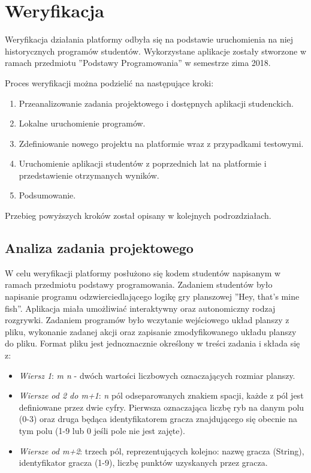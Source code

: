\chapter{Weryfikacja}
\label{chapter:verify}

Weryfikacja działania platformy odbyła się na podstawie uruchomienia na niej historycznych programów studentów.
Wykorzystane aplikacje zostały stworzone w ramach przedmiotu ”Podstawy Programowania” w semestrze zima 2018.

Proces weryfikacji można podzielić na następujące kroki:
\begin{enumerate}
    \item Przeanalizowanie zadania projektowego i dostępnych aplikacji studenckich.
    \item Lokalne uruchomienie programów.
    \item Zdefiniowanie nowego projektu na platformie wraz z przypadkami testowymi.
    \item Uruchomienie aplikacji studentów z poprzednich lat na platformie i przedstawienie otrzymanych wyników.
    \item Podsumowanie.
\end{enumerate}

Przebieg powyższych kroków został opisany w kolejnych podrozdziałach.


\section{Analiza zadania projektowego}
\label{analysis_students_projects}

W celu weryfikacji platformy posłużono się kodem studentów napisanym w ramach przedmiotu podstawy programowania.
Zadaniem studentów było napisanie programu odzwierciedlającego logikę gry planszowej ”Hey, that’s mine fish”.
Aplikacja miała umożliwiać interaktywny oraz autonomiczny rodzaj rozgrywki.
Zadaniem programów było wczytanie wejściowego układ planszy z pliku, wykonanie zadanej akcji oraz zapisanie zmodyfikowanego układu planszy do pliku.
Format pliku jest jednoznacznie określony w treści zadania i składa się z:
\begin{itemize}
    \item \textit{Wiersz 1}: \textit{m n} - dwóch wartości liczbowych oznaczających rozmiar planszy.
    \item \textit{Wiersze od 2 do m+1}: \textit{n} pól odseparowanych znakiem spacji, każde z pól jest definiowane przez dwie cyfry.
    Pierwsza oznaczająca liczbę ryb na danym polu (0-3) oraz druga będąca identyfikatorem gracza znajdującego się obecnie na tym polu (1-9 lub 0 jeśli pole nie jest zajęte).
    \item \textit{Wiersze od m+2}: trzech pól, reprezentujących kolejno: nazwę gracza (String), identyfikator gracza (1-9), liczbę punktów uzyskanych przez gracza.
\end{itemize}

